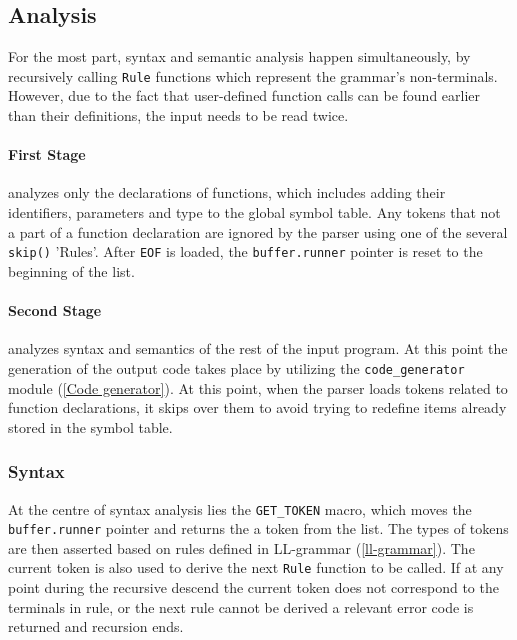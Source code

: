 \subsection{Analysis} 
\label{parser:analysis}
For the most part, syntax and semantic analysis happen simultaneously, by recursively calling \texttt{Rule} functions which represent the grammar's non-terminals. However, due to the fact that user-defined function calls can be found earlier than their definitions, the input needs to be read twice.

\paragraph{First Stage}
\label{parser:analysis:stage1}
 analyzes only the declarations of functions, which includes adding their identifiers, parameters and type to the global symbol table. Any tokens that not a part of a function declaration are ignored by the parser using one of the several \texttt{skip()} 'Rules'. After \texttt{EOF} is loaded, the \texttt{buffer.runner} pointer is reset to the beginning of the list. 

\paragraph{Second Stage} 
\label{parser:analysis:stage2}
analyzes syntax and semantics of the rest of the input program. At this point the generation of the output code takes place by utilizing the \texttt{code\_generator} module (\ref{Code generator}). At this point, when the parser loads tokens related to function declarations, it skips over them to avoid trying to redefine items already stored in the symbol table.

\subsubsection{Syntax}
\label{parser:analysis:syntax}
At the centre of syntax analysis lies the \texttt{GET\_TOKEN} macro, which moves the \texttt{buffer.runner} pointer and returns the a token from the list. The types of tokens are then asserted based on rules defined in LL-grammar (\ref{ll-grammar}). The current token is also used to derive the next \texttt{Rule} function to be called. If at any point during the recursive descend the current token does not correspond to the terminals in rule, or the next rule cannot be derived a relevant error code is returned and recursion ends. 

